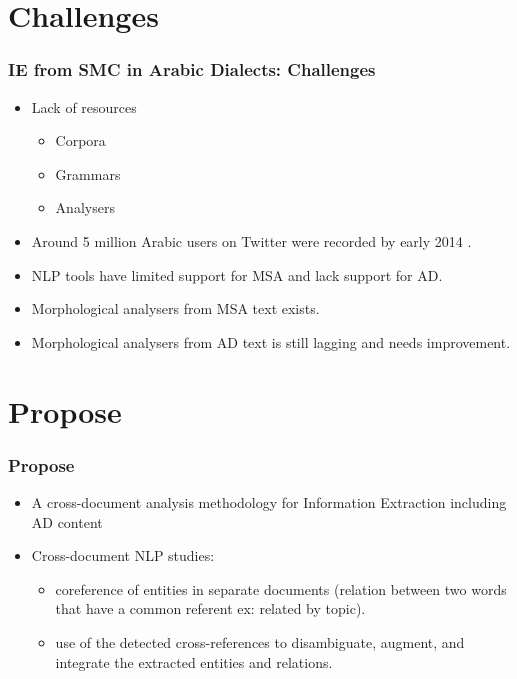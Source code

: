 \documentclass[xcolor=table]{beamer}
\begin{document}
\section{Challenges}
\begin{frame}
\frametitle{IE from SMC in Arabic Dialects: Challenges}
\begin{itemize}
\item Lack of resources
\begin{itemize}
\item Corpora
\item Grammars
\item Analysers
\end{itemize}
\item Around {\color{red}5 million} Arabic users on Twitter were recorded by early 2014 \cite{twitter_social}.
\item NLP tools have limited support for MSA and lack support for AD.
\item  Morphological analysers from MSA text exists\cite{Madamira2014, Yamama2016}.
\item Morphological analysers from AD text is still lagging and needs improvement\cite{Madar2018, Guidelines2018, Curras2017}.
\end{itemize}

\end{frame}
\section{Propose}
\begin{frame}
\frametitle{Propose}
\begin{itemize}
\item A cross-document analysis methodology for Information Extraction including AD content
\item Cross-document NLP studies:
\begin{itemize}
\item coreference of entities in separate documents (relation between two words that have a common referent ex: related by topic).

\item use of the detected cross-references to disambiguate, augment, and integrate the extracted entities and relations.
\end{itemize}
\end{itemize}

\end{frame}
\end{document}
